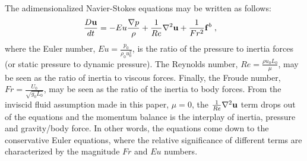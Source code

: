 The adimensionalized Navier-Stokes equations may be written as follows:
\begin{align}
\frac{D{\bf u}}{dt} & =-Eu \frac{\nabla p}{\rho}  + \frac{1}{Re} \nabla^{2} {\bf u}+ \frac{1}{Fr^2}{\bf f}^b \label{eq:NS_nondim} \; ,
\end{align}
where the Euler number, $Eu=\frac{p_0}{\rho_0 u_0^2}$, is the ratio of the pressure to inertia forces (or static pressure to dynamic pressure). The Reynolds number, $Re=\frac{\rho u_0 L_0}{\mu}$, may be seen as the ratio of inertia to viscous forces. Finally, the Froude number, $Fr=\frac{U_0}{\sqrt{g_0 L_0}}$, may be seen as the ratio of the inertia to body forces. From the inviscid fluid assumption made in this paper, $\mu=0$, the $\frac{1}{Re} \nabla^{2} {\bf u}$ term drops out of the equations and the momentum balance is the interplay of inertia, pressure and gravity/body force. In other words, the equations come down to the conservative Euler equations, where the relative significance of different terms are characterized by the magnitude $Fr$ and $Eu$ numbers.
